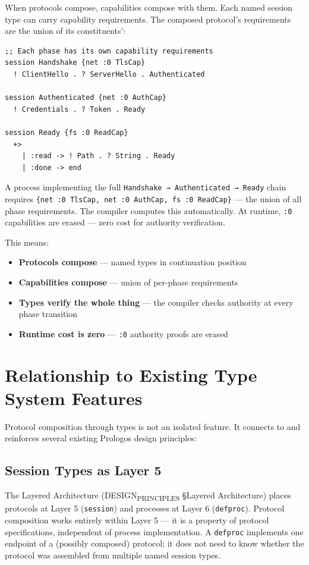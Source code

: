\documentclass[11pt]{article}
\begin{document}
When protocols compose, capabilities compose with them. Each named session type
can carry capability requirements. The composed protocol's requirements are the
union of its constituents':

\begin{verbatim}
;; Each phase has its own capability requirements
session Handshake {net :0 TlsCap}
  ! ClientHello . ? ServerHello . Authenticated

session Authenticated {net :0 AuthCap}
  ! Credentials . ? Token . Ready

session Ready {fs :0 ReadCap}
  +>
    | :read -> ! Path . ? String . Ready
    | :done -> end
\end{verbatim}

A process implementing the full \texttt{Handshake → Authenticated → Ready} chain
requires \texttt{\{net :0 TlsCap, net :0 AuthCap, fs :0 ReadCap\}} --- the union of
all phase requirements. The compiler computes this automatically. At runtime,
\texttt{:0} capabilities are erased --- zero cost for authority verification.

This means:
\begin{itemize}
\item \textbf{Protocols compose} --- named types in continuation position
\item \textbf{Capabilities compose} --- union of per-phase requirements
\item \textbf{Types verify the whole thing} --- the compiler checks authority at every
phase transition
\item \textbf{Runtime cost is zero} --- \texttt{:0} authority proofs are erased
\end{itemize}
\section{Relationship to Existing Type System Features}
\label{sec:orgfcf0b2f}

Protocol composition through types is not an isolated feature. It connects
to and reinforces several existing Prologos design principles:
\subsection{Session Types as Layer 5}
\label{sec:org16fa2c1}

The Layered Architecture (DESIGN\textsubscript{PRINCIPLES} §Layered Architecture) places
protocols at Layer 5 (\texttt{session}) and processes at Layer 6 (\texttt{defproc}). Protocol
composition works entirely within Layer 5 --- it is a property of protocol
specifications, independent of process implementation. A \texttt{defproc} implements
one endpoint of a (possibly composed) protocol; it does not need to know
whether the protocol was assembled from multiple named session types.
\end{document}
